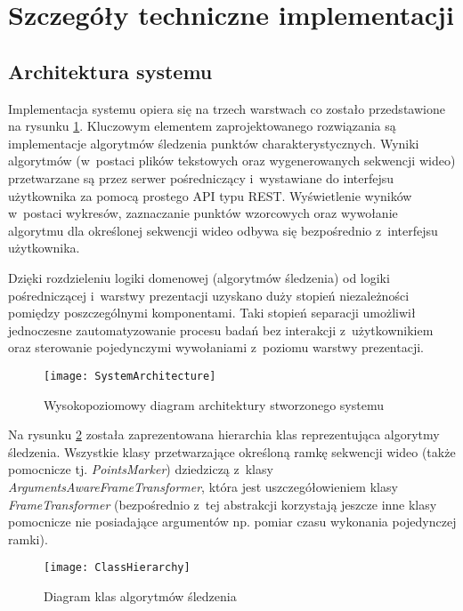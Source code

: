   \section{Szczegóły techniczne implementacji}\label{Section_ImplementationDetails}

    \subsection{Architektura systemu}

      Implementacja systemu opiera się na trzech warstwach co zostało przedstawione na rysunku \ref{fig:SystemArchitecture}. Kluczowym elementem zaprojektowanego rozwiązania są implementacje algorytmów śledzenia punktów charakterystycznych. Wyniki algorytmów (w~postaci plików tekstowych oraz wygenerowanych sekwencji wideo) przetwarzane są przez serwer pośredniczący i~wystawiane do interfejsu użytkownika za pomocą prostego API typu REST. Wyświetlenie wyników w~postaci wykresów, zaznaczanie punktów wzorcowych oraz wywołanie algorytmu dla określonej sekwencji wideo odbywa się bezpośrednio z~interfejsu użytkownika.

      Dzięki rozdzieleniu logiki domenowej (algorytmów śledzenia) od logiki pośredniczącej i~warstwy prezentacji uzyskano duży stopień niezależności pomiędzy poszczególnymi komponentami. Taki stopień separacji umożliwił jednoczesne zautomatyzowanie procesu badań bez interakcji z~użytkownikiem oraz sterowanie pojedynczymi wywołaniami z~poziomu warstwy prezentacji.

        \begin{figure}[!ht]
          \centering
          \texttt{[image: SystemArchitecture]}
          \caption[Wysokopoziomowy diagram architektury stworzonego systemu]
                  {Wysokopoziomowy diagram architektury stworzonego systemu}
          \label{fig:SystemArchitecture}
        \end{figure}

      Na rysunku \ref{fig:ClassHierarchy} została zaprezentowana hierarchia klas reprezentująca algorytmy śledzenia. Wszystkie klasy przetwarzające określoną ramkę sekwencji wideo (także pomocnicze tj. \textit{PointsMarker}) dziedziczą z~klasy \textit{ArgumentsAwareFrameTransformer}, która jest uszczegółowieniem klasy \textit{FrameTransformer} (bezpośrednio z~tej abstrakcji korzystają jeszcze inne klasy pomocnicze nie posiadające argumentów np. pomiar czasu wykonania pojedynczej ramki).

        \begin{figure}[!ht]
          \centering
          \texttt{[image: ClassHierarchy]}
          \caption[Diagram klas algorytmów śledzenia]{Diagram klas algorytmów śledzenia}
          \label{fig:ClassHierarchy}
        \end{figure}

